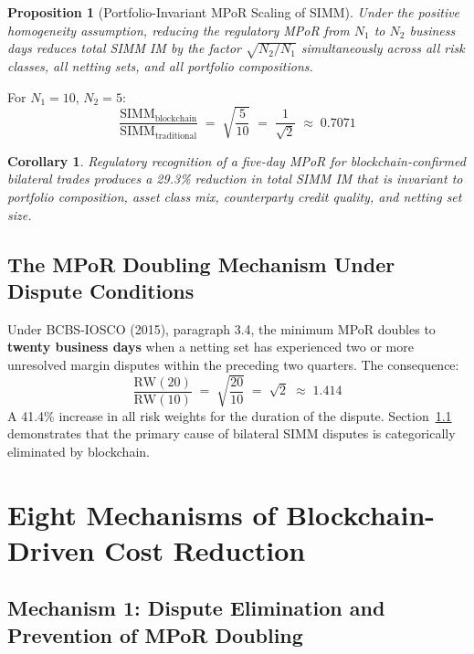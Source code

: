 \documentclass[12pt,letterpaper]{article}
\numberwithin{equation}{section}
\newtheorem{proposition}{Proposition}[section]
\newtheorem{corollary}{Corollary}[proposition]
\theoremstyle{remark}
\newcommand{\SIMM}{\mathrm{SIMM}}
\newcommand{\RW}{\mathrm{RW}}
\begin{document}
\begin{proposition}[Portfolio-Invariant MPoR Scaling of SIMM]
  Under the positive homogeneity assumption, reducing the regulatory MPoR
  from $N_1$ to $N_2$ business days reduces total SIMM IM by the factor
  $\sqrt{N_2/N_1}$ simultaneously across all risk classes, all netting sets,
  and all portfolio compositions.
\end{proposition}

For $N_1 = 10$, $N_2 = 5$:
\begin{equation}
  \frac{\SIMM_{\text{blockchain}}}{\SIMM_{\text{traditional}}}
  \;=\;\sqrt{\frac{5}{10}}\;=\;\frac{1}{\sqrt{2}}\;\approx\;0.7071
  \label{eq:primary}
\end{equation}

\begin{corollary}
  Regulatory recognition of a five-day MPoR for blockchain-confirmed bilateral
  trades produces a 29.3\% reduction in total SIMM IM that is invariant to
  portfolio composition, asset class mix, counterparty credit quality, and
  netting set size.
\end{corollary}

\subsection{The MPoR Doubling Mechanism Under Dispute Conditions}

Under BCBS-IOSCO (2015), paragraph 3.4, the minimum MPoR doubles to
\textbf{twenty business days} when a netting set has experienced two or more
unresolved margin disputes within the preceding two quarters. The consequence:
\begin{equation}
  \frac{\RW(20)}{\RW(10)} \;=\;\sqrt{\frac{20}{10}}\;=\;\sqrt{2}\;\approx\;1.414
  \label{eq:doubling}
\end{equation}
A 41.4\% increase in all risk weights for the duration of the dispute.
Section~\ref{subsec:m1} demonstrates that the primary cause of bilateral
SIMM disputes is categorically eliminated by blockchain.

\section{Eight Mechanisms of Blockchain-Driven Cost Reduction}
\label{sec:mechanisms}

\subsection{Mechanism 1: Dispute Elimination and Prevention of MPoR Doubling}
\label{subsec:m1}
\end{document}
